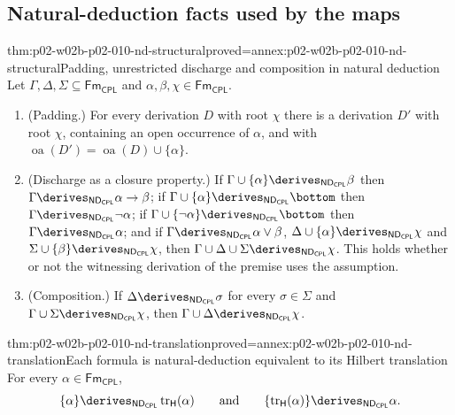 \subsection{Natural-deduction facts used by the maps}
\label{sec:p02-w02b-p02-010-nd}

\begin{hblemma}{thm:p02-w02b-p02-010-nd-structural}{proved=annex:p02-w02b-p02-010-nd-structural}{Padding, unrestricted discharge and composition in natural deduction}
Let \(\Gamma,\Delta,\Sigma\subseteq\mathsf{Fm}_{\mathsf{CPL}}\) and
\(\alpha,\beta,\chi\in\mathsf{Fm}_{\mathsf{CPL}}\).
\begin{enumerate}
  \item (Padding.) For every derivation \(D\) with root \(\chi\) there is a
    derivation \(D'\) with root \(\chi\), containing an open occurrence of
    \(\alpha\), and with
    \(\operatorname{oa}(D')=\operatorname{oa}(D)\cup\{\alpha\}\).
  \item (Discharge as a closure property.)  If
    \(\Gamma\cup\{\alpha\}\derives_{\mathsf{ND}_{\mathsf{CPL}}}\beta\) then
    \(\Gamma\derives_{\mathsf{ND}_{\mathsf{CPL}}}\alpha\to\beta\); if
    \(\Gamma\cup\{\alpha\}\derives_{\mathsf{ND}_{\mathsf{CPL}}}\bottom\) then
    \(\Gamma\derives_{\mathsf{ND}_{\mathsf{CPL}}}\neg\alpha\); if
    \(\Gamma\cup\{\neg\alpha\}\derives_{\mathsf{ND}_{\mathsf{CPL}}}\bottom\)
    then \(\Gamma\derives_{\mathsf{ND}_{\mathsf{CPL}}}\alpha\); and if
    \(\Gamma\derives_{\mathsf{ND}_{\mathsf{CPL}}}\alpha\lor\beta\),
    \(\Delta\cup\{\alpha\}\derives_{\mathsf{ND}_{\mathsf{CPL}}}\chi\) and
    \(\Sigma\cup\{\beta\}\derives_{\mathsf{ND}_{\mathsf{CPL}}}\chi\), then
    \(\Gamma\cup\Delta\cup\Sigma\derives_{\mathsf{ND}_{\mathsf{CPL}}}\chi\).
    This holds whether or not the witnessing derivation of the premise uses
    the assumption.
  \item (Composition.) If \(\Delta\derives_{\mathsf{ND}_{\mathsf{CPL}}}\sigma\)
    for every \(\sigma\in\Sigma\) and
    \(\Gamma\cup\Sigma\derives_{\mathsf{ND}_{\mathsf{CPL}}}\chi\), then
    \(\Gamma\cup\Delta\derives_{\mathsf{ND}_{\mathsf{CPL}}}\chi\).
\end{enumerate}
\end{hblemma}

\begin{hblemma}{thm:p02-w02b-p02-010-nd-translation}{proved=annex:p02-w02b-p02-010-nd-translation}{Each formula is natural-deduction equivalent to its Hilbert translation}
For every \(\alpha\in\mathsf{Fm}_{\mathsf{CPL}}\),
\[
  \{\alpha\}\derives_{\mathsf{ND}_{\mathsf{CPL}}}\operatorname{tr}_{\mathsf H}(\alpha)
  \qquad\text{and}\qquad
  \{\operatorname{tr}_{\mathsf H}(\alpha)\}\derives_{\mathsf{ND}_{\mathsf{CPL}}}\alpha .
\]
\end{hblemma}


